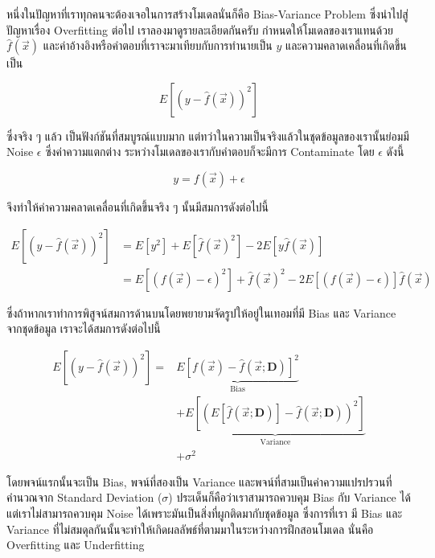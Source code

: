 หนึ่งในปัญหาที่เราทุกคนจะต้องเจอในการสร้างโมเดลนั่นก็คือ Bias-Variance Problem ซึ่งนำไปสู่ปัญหาเรื่อง Overfitting ต่อไป
เราลองมาดูรายละเอียดกันครับ กำหนดให้โมเดลของเราแทนด้วย $\hat{f}(\vec{x})$ และค่าอ้างอิงหรือคำตอบที่เราจะมาเทียบกับการทำนายเป็น 
$y$ และความคลาดเคลื่อนที่เกิดขึ้นเป็น

\begin{equation}
    E\left[\left(y - \hat{f}(\vec{x})\right)^2\right]
\end{equation}

ซึ่งจริง ๆ แล้ว เป็นฟังก์ชันที่สมบูรณ์แบบมาก แต่ทว่าในความเป็นจริงแล้วในชุดข้อมูลของเรานั้นย่อมมี Noise $\epsilon$ ซึ่งค่าความแตกต่าง%
ระหว่างโมเดลของเรากับคำตอบก็จะมีการ Contaminate โดย $\epsilon$ ดังนี้

\begin{equation}
    y = f(\vec{x}) + \epsilon
\end{equation}

\noindent จึงทำให้ค่าความคลาดเคลื่อนที่เกิดขึ้นจริง ๆ นั้นมีสมการดังต่อไปนี้ 

\begin{align}
    E\left[\left(y - \hat{f}(\vec{x})\right)^2\right] &= 
    E\left[y^2\right] + E\left[\hat{f}(\vec{x})^2\right] - 2 E\left[y\hat{f}(\vec{x})\right] \\
    &= E\left[\left(f(\vec{x}) - \epsilon\right)^2\right] + \hat{f}(\vec{x})^2 - 2 E\left[\left(f(\vec{x}) - 
    \epsilon\right)\right]\hat{f}(\vec{x})
\end{align}

\noindent ซึ่งถ้าหากเราทำการพิสูจน์สมการด้านบนโดยพยายามจัดรูปให้อยู่ในเทอมที่มี Bias และ Variance จากชุดข้อมูล เราจะได้สมการดังต่อไปนี้

\begin{align}\label{eq:bias_variance}
E\left[\left(y - \hat{f}(\vec{x})\right)^2\right] = 
    & \underbrace{E\left[f(\vec{x}) - \hat{f}\left(\vec{x}; \mathbf{D}\right)\right]^2}_{\text{Bias}} \nonumber \\
    & + \underbrace{E\left[\left(E\left[\hat{f}\left(\vec{x}; \mathbf{D}\right)\right] - 
    \hat{f}\left(\vec{x}; \mathbf{D}\right)\right)^2\right]}_{\text{Variance}} \nonumber \\
    & + \sigma^2
\end{align}

โดยพจน์แรกนั้นจะเป็น Bias, พจน์ที่สองเป็น Variance และพจน์ที่สามเป็นค่าความแปรปรวนที่คำนวณจาก Standard Deviation ($\sigma$)
ประเด็นก็คือว่าเราสามารถควบคุม Bias กับ Variance ได้ แต่เราไม่สามารถควบคุม Noise ได้เพราะมันเป็นสิ่งที่ผูกติดมากับชุดข้อมูล ซึ่งการที่เรา%
มี Bias และ Variance ที่ไม่สมดุลกันนั้นจะทำให้เกิดผลลัพธ์ที่ตามมาในระหว่างการฝึกสอนโมเดล นั่นคือ Overfitting และ Underfitting

